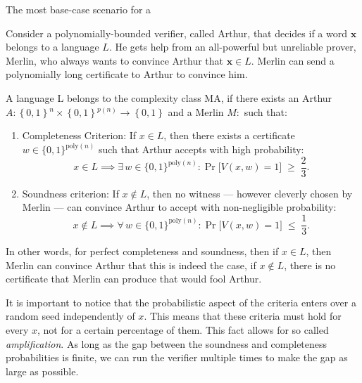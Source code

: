 \documentclass[11pt]{article}
\newcommand{\skl}[1]{\mathopen{}\left\{ #1 \right\}\mathclose{}}
\newcommand{\bfx}{\mathbf{x}}
\begin{document}
The most base-case scenario for a 

Consider a polynomially-bounded verifier, called Arthur, that decides if a word $\bfx$ belongs to a language $L$. He gets help from an all-powerful but unreliable prover, Merlin, who always wants to convince Arthur that $\bfx \in L$. Merlin can send a polynomially long certificate to Arthur to convince him.

A language L belongs to the complexity class MA, if there exists an Arthur $A: \skl{0,1}^n \times \skl{0,1}^{p(n)} \rightarrow \skl{0,1}$ and a Merlin $M: $ such that:
\begin{enumerate}
  \item Completeness Criterion:
  If $x \in L$, then there exists a certificate $w \in \{0,1\}^{\mathrm{poly}(n)}$
such that Arthur accepts with high probability:
\[
    x \in L \implies
    \exists\, w \in \{0,1\}^{\mathrm{poly}(n)} :
    \Pr\bigl[V(x, w) = 1\bigr] \;\geq\; \frac{2}{3}.
\]


  \item Soundness criterion:
If $x \notin L$, then no witness — however cleverly chosen by Merlin —
can convince Arthur to accept with non-negligible probability:
\[
    x \notin L \implies
    \forall\, w \in \{0,1\}^{\mathrm{poly}(n)} :
    \Pr\bigl[V(x, w) = 1\bigr] \;\leq\; \frac{1}{3}.
\]
\end{enumerate}

In other words, for perfect completeness and soundness, then if $x \in L$, then Merlin can convince Arthur that this is indeed the case, if $x \notin L$, there is no certificate that Merlin can produce that would fool Arthur.

It is important to notice that the probabilistic aspect of the criteria enters over a random seed independently of $x$. This means that these criteria must hold for every $x$, not for a certain percentage of them. This fact allows for so called \emph{amplification}. As long as the gap between the soundness and completeness probabilities is finite, we can run the verifier multiple times to make the gap as large as possible.


\end{document}
